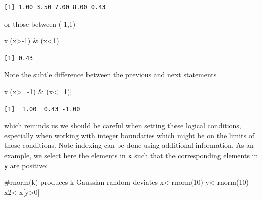 \documentclass[
  letterpaper,
  DIV=11,
  numbers=noendperiod]{scrartcl}
\newenvironment{Shaded}{\begin{snugshade}}{\end{snugshade}}
\newcommand{\CommentTok}[1]{\textcolor[rgb]{0.37,0.37,0.37}{#1}}
\newcommand{\DecValTok}[1]{\textcolor[rgb]{0.68,0.00,0.00}{#1}}
\newcommand{\FunctionTok}[1]{\textcolor[rgb]{0.28,0.35,0.67}{#1}}
\newcommand{\NormalTok}[1]{\textcolor[rgb]{0.00,0.23,0.31}{#1}}
\newcommand{\OtherTok}[1]{\textcolor[rgb]{0.00,0.23,0.31}{#1}}
\newcommand{\SpecialCharTok}[1]{\textcolor[rgb]{0.37,0.37,0.37}{#1}}
\begin{document}
\begin{verbatim}
[1] 1.00 3.50 7.00 8.00 0.43
\end{verbatim}

\noindent or those between (-1,1)

\begin{Shaded}
\begin{Highlighting}[]
\NormalTok{x[(x}\SpecialCharTok{\textgreater{}{-}}\DecValTok{1}\NormalTok{) }\SpecialCharTok{\&}\NormalTok{ (x}\SpecialCharTok{\textless{}}\DecValTok{1}\NormalTok{)]}
\end{Highlighting}
\end{Shaded}

\begin{verbatim}
[1] 0.43
\end{verbatim}

Note the subtle difference between the previous and next statements

\begin{Shaded}
\begin{Highlighting}[]
\NormalTok{x[(x}\SpecialCharTok{\textgreater{}={-}}\DecValTok{1}\NormalTok{) }\SpecialCharTok{\&}\NormalTok{ (x}\SpecialCharTok{\textless{}=}\DecValTok{1}\NormalTok{)]}
\end{Highlighting}
\end{Shaded}

\begin{verbatim}
[1]  1.00  0.43 -1.00
\end{verbatim}

\noindent which reminds us we should be careful when setting these
logical conditions, especially when working with integer boundaries
which might be on the limits of those conditions. Note indexing can be
done using additional information. As an example, we select here the
elements in \texttt{x} such that the corresponding elements in
\texttt{y} are positive:

\begin{Shaded}
\begin{Highlighting}[]
\CommentTok{\#rnorm(k) produces k Gaussian random deviates}
\NormalTok{x}\OtherTok{\textless{}{-}}\FunctionTok{rnorm}\NormalTok{(}\DecValTok{10}\NormalTok{)}
\NormalTok{y}\OtherTok{\textless{}{-}}\FunctionTok{rnorm}\NormalTok{(}\DecValTok{10}\NormalTok{)}
\NormalTok{x2}\OtherTok{\textless{}{-}}\NormalTok{x[y}\SpecialCharTok{\textgreater{}}\DecValTok{0}\NormalTok{]}
\end{Highlighting}
\end{Shaded}
\end{document}
